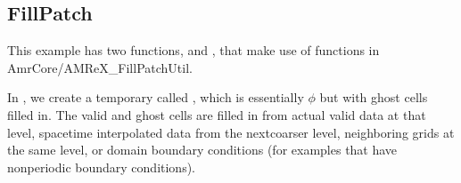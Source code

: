 \documentclass[letterpaper,10pt,english]{sphinxmanual}
\begin{document}
\begin{sphinxVerbatim}[commandchars=\\\{\}]
               

     
        
           
               
  

\end{sphinxVerbatim}


\subsection{FillPatch}
\label{\detokenize{AmrCore:fillpatch}}\label{\detokenize{AmrCore:ss-fillpatch}}
\sphinxAtStartPar
This example has two functions,  and ,
that make use of functions in AmrCore/AMReX\_FillPatchUtil.

\sphinxAtStartPar
In , we create a temporary  called , which
is essentially \(\phi\) but with ghost cells filled in. The valid and ghost cells are filled in from
actual valid data at that level, space\sphinxhyphen{}time interpolated data from the next\sphinxhyphen{}coarser level,
neighboring grids at the same level, or domain boundary conditions
(for examples that have non\sphinxhyphen{}periodic boundary conditions).

\begin{sphinxVerbatim}[commandchars=\\\{\}]
 \PYG{p}{[}\PYG{p}{]} \PYG{p}{[}\PYG{p}{]}  
    
\end{sphinxVerbatim}
\end{document}

